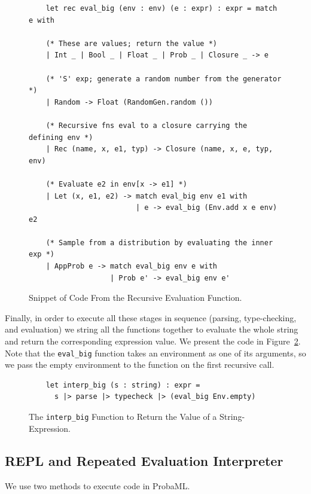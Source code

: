 \documentclass[pageno]{jpaper}
\begin{document}
\begin{figure}[hbt]
  \begin{verbatim}
    let rec eval_big (env : env) (e : expr) : expr = match e with

    (* These are values; return the value *)
    | Int _ | Bool _ | Float _ | Prob _ | Closure _ -> e

    (* 'S' exp; generate a random number from the generator *)
    | Random -> Float (RandomGen.random ())

    (* Recursive fns eval to a closure carrying the defining env *)
    | Rec (name, x, e1, typ) -> Closure (name, x, e, typ, env)

    (* Evaluate e2 in env[x -> e1] *)
    | Let (x, e1, e2) -> match eval_big env e1 with
                         | e -> eval_big (Env.add x e env) e2

    (* Sample from a distribution by evaluating the inner exp *)
    | AppProb e -> match eval_big env e with
                   | Prob e' -> eval_big env e'
  \end{verbatim}
  \vspace{-8mm}
  \caption{Snippet of Code From the Recursive Evaluation Function.}
  \label{fig:implement_eval}
\end{figure}

Finally, in order to execute all these stages in sequence (parsing, type-checking, and evaluation) we string all the functions together to evaluate the whole string and return the corresponding expression value. We present the code in Figure~\ref{fig:interp_big}. Note that the \texttt{eval\_big} function takes an environment as one of its arguments, so we pass the empty environment to the function on the first recursive call.

\begin{figure}[hbt]
  \begin{verbatim}
    let interp_big (s : string) : expr =
      s |> parse |> typecheck |> (eval_big Env.empty)
  \end{verbatim}
  \vspace{-8mm}
  \caption{The \texttt{interp\_big} Function to Return the Value of a String-Expression.}
  \label{fig:interp_big}
\end{figure}

\subsection{REPL and Repeated Evaluation Interpreter}
We use two methods to execute code in ProbaML.
\end{document}
